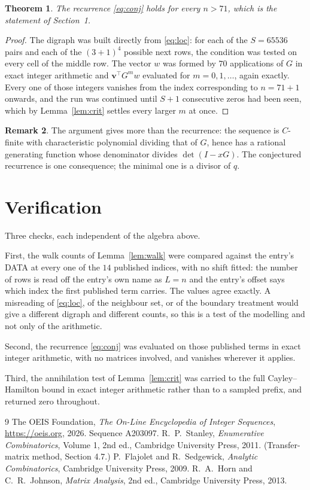 \documentclass[11pt,a4paper]{article}
\theoremstyle{plain}
\newtheorem{theorem}{Theorem}
\theoremstyle{definition}
\newtheorem{remark}[theorem]{Remark}
\begin{document}
\begin{theorem}
The recurrence \eqref{eq:conj} holds for every $n>71$, which is the statement of
Section~1.
\end{theorem}

\begin{proof}
The digraph was built directly from \eqref{eq:loc}: for each of the $S=65536$ pairs and each
of the $(3+1)^{4}$ possible next rows, the condition was tested on every cell of
the middle row. The vector $w$ was formed by $70$ applications of $G$ in exact integer
arithmetic and $\mathbf{v}^{\!\top}G^{m}w$ evaluated for $m=0,1,\dots$, again exactly.
Every one of those integers vanishes from the index corresponding to $n=71+1$ onwards,
and the run was continued until $S+1$ consecutive zeros had been seen, which by
Lemma~\ref{lem:crit} settles every larger $m$ at once.
\end{proof}

\begin{remark}
The argument gives more than the recurrence: the sequence is $C$-finite with characteristic
polynomial dividing that of $G$, hence has a rational generating function whose denominator
divides $\det(I-xG)$. The conjectured recurrence is one consequence; the minimal one is a
divisor of $q$.
\end{remark}

\section{Verification}

Three checks, each independent of the algebra above.

First, the walk counts of Lemma~\ref{lem:walk} were compared against the entry's DATA at
every one of the $14$ published indices, with no shift fitted: the number of rows is
read off the entry's own name as $L=n$ and the entry's offset says which index the first
published term carries. The values agree exactly. A misreading of \eqref{eq:loc}, of the
neighbour set, or of the boundary treatment would give a different digraph and different
counts, so this is a test of the modelling and not only of the arithmetic.

Second, the recurrence \eqref{eq:conj} was evaluated on those published terms in exact
integer arithmetic, with no matrices involved, and vanishes wherever it applies.

Third, the annihilation test of Lemma~\ref{lem:crit} was carried to the full
Cayley--Hamilton bound in exact integer arithmetic rather than to a sampled prefix, and
returned zero throughout.

\begin{thebibliography}{9}
 The OEIS Foundation, \emph{The On-Line Encyclopedia of Integer
Sequences}, \url{https://oeis.org}, 2026. Sequence A203097.
 R.~P.~Stanley, \emph{Enumerative Combinatorics}, Volume 1, 2nd ed.,
Cambridge University Press, 2011. (Transfer-matrix method, Section 4.7.)
 P.~Flajolet and R.~Sedgewick, \emph{Analytic Combinatorics}, Cambridge
University Press, 2009.
 R.~A.~Horn and C.~R.~Johnson, \emph{Matrix Analysis}, 2nd ed., Cambridge
University Press, 2013.
\end{thebibliography}
\end{document}
